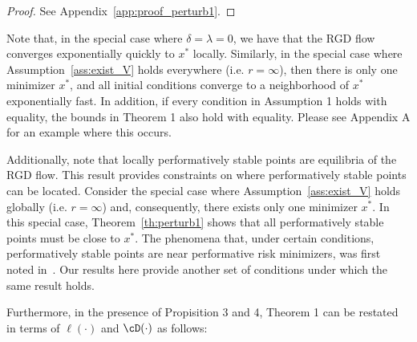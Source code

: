 \begin{proof}
See Appendix~\ref{app:proof_perturb1}.
\end{proof}

Note that, in the special case where $\delta = \lambda = 0$, we have that the RGD flow converges exponentially quickly to $x^*$ locally. Similarly, in the special case where Assumption~\ref{ass:exist_V} holds everywhere (i.e. $r = \infty$), then there is only one minimizer $x^*$, and all initial conditions converge to a neighborhood of $x^*$ exponentially fast. In addition, if every condition in Assumption 1 holds with equality, the bounds in Theorem 1 also hold with equality. Please see Appendix A for an example where this occurs.

Additionally, note that locally performatively stable points are equilibria of the RGD flow. This result provides constraints on where performatively stable points can be located. Consider the special case where Assumption~\ref{ass:exist_V} holds globally (i.e. $r = \infty$) and, consequently, there exists only one minimizer $x^*$. In this special case, Theorem~\ref{th:perturb1} shows that all performatively stable points must be close to $x^*$. The phenomena that, under certain conditions, performatively stable points are near performative risk minimizers, was first noted in~\citet{Perdomo:2020tz}. Our results here provide another set of conditions under which the same result holds.

Furthermore, in the presence of Propisition 3 and 4, Theorem 1 can be restated in terms of $\ell(\cdot)$ and $\cD(\cdot)$ as follows:

